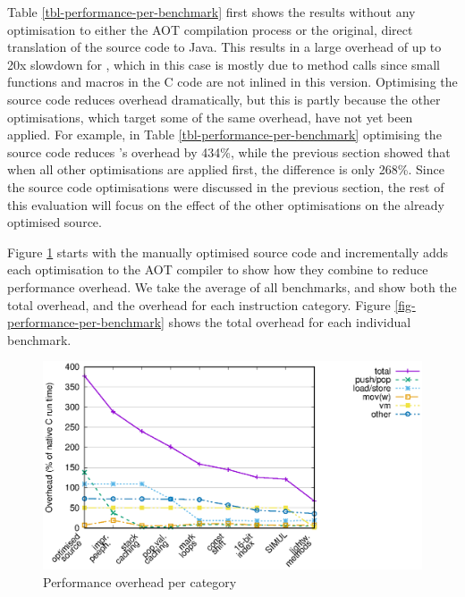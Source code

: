 Table \ref{tbl-performance-per-benchmark} first shows the results without any optimisation to either the AOT compilation process or the original, direct translation of the source code to Java. This results in a large overhead of up to 20x slowdown for , which in this case is mostly due to method calls since small functions and macros in the C code are not inlined in this version. Optimising the source code reduces overhead dramatically, but this is partly because the other optimisations, which target some of the same overhead, have not yet been applied. For example, in Table \ref{tbl-performance-per-benchmark} optimising the source code reduces 's overhead by 434\%, while the previous section showed that when all other optimisations are applied first, the difference is only 268\%. Since the source code optimisations were discussed in the previous section, the rest of this evaluation will focus on the effect of the other optimisations on the already optimised source.

Figure \ref{fig-performance-per-opcode-category} starts with the manually optimised source code and incrementally adds each optimisation to the AOT compiler to show how they combine to reduce performance overhead. We take the average of all benchmarks, and show both the total overhead, and the overhead for each instruction category. Figure \ref{fig-performance-per-benchmark} shows the total overhead for each individual benchmark.

\begin{figure}
\centering
\includegraphics[width=\mygraphsize]{performance-per-opcode-category3a.eps}
\caption{Performance overhead per category}
\label{fig-performance-per-opcode-category}
\end{figure}

